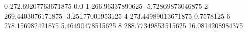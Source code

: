 0 272.69207763671875 0.0
1 266.96337890625 -5.72869873046875
2 269.4403076171875 -3.25177001953125
4 273.44989013671875 0.7578125
6 278.156982421875 5.46490478515625
8 288.77349853515625 16.0814208984375
